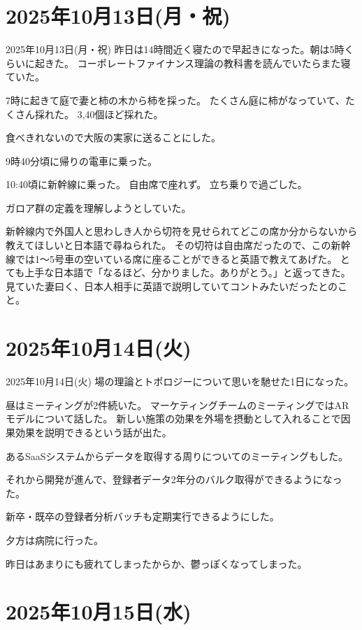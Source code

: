 \documentclass[dvipdfmx, autodetect-engine, aspectratio=169, 10.5pt]{beamer}
\begin{document}
\section{2025年10月13日(月・祝)}

\begin{frame}{2025年10月13日(月・祝)}
昨日は14時間近く寝たので早起きになった。朝は5時くらいに起きた。
コーポレートファイナンス理論の教科書を読んでいたらまた寝ていた。

7時に起きて庭で妻と柿の木から柿を採った。
たくさん庭に柿がなっていて、たくさん採れた。
3,40個ほど採れた。

食べきれないので大阪の実家に送ることにした。

9時40分頃に帰りの電車に乗った。

10:40頃に新幹線に乗った。
自由席で座れず。
立ち乗りで過ごした。

ガロア群の定義を理解しようとしていた。

新幹線内で外国人と思わしき人から切符を見せられてどこの席か分からないから教えてほしいと日本語で尋ねられた。
その切符は自由席だったので、この新幹線では1〜5号車の空いている席に座ることができると英語で教えてあげた。
とても上手な日本語で「なるほど、分かりました。ありがとう。」と返ってきた。
見ていた妻曰く、日本人相手に英語で説明していてコントみたいだったとのこと。
\end{frame}

\section{2025年10月14日(火)}

\begin{frame}{2025年10月14日(火)}
場の理論とトポロジーについて思いを馳せた1日になった。

昼はミーティングが2件続いた。
マーケティングチームのミーティングではARモデルについて話した。
新しい施策の効果を外場を摂動として入れることで因果効果を説明できるという話が出た。

あるSaaSシステムからデータを取得する周りについてのミーティングもした。

それから開発が進んで、登録者データ2年分のバルク取得ができるようになった。

新卒・既卒の登録者分析バッチも定期実行できるようにした。

夕方は病院に行った。

昨日はあまりにも疲れてしまったからか、鬱っぽくなってしまった。
\end{frame}

\section{2025年10月15日(水)}
\end{document}
